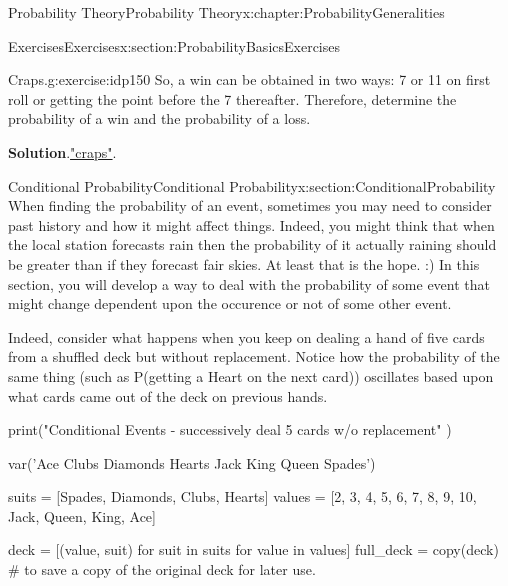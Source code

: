 \documentclass[oneside,10pt,]{book}
\newcommand{\blocktitlefont}{\relax}
\numberwithin{equation}{section}
\begin{document}
\begin{chapterptx}{Probability Theory}{}{Probability Theory}{}{}{x:chapter:ProbabilityGeneralities}
\begin{sectionptx}{Exercises}{}{Exercises}{}{}{x:section:ProbabilityBasicsExercises}
\begin{inlineexercise}{Craps.}{g:exercise:idp150}
So, a win can be obtained in two ways: 7 or 11 on first roll or getting the point before the 7 thereafter. Therefore, determine the probability of a win and the probability of a loss.%
\par\smallskip%
\noindent\textbf{\blocktitlefont Solution}.\hypertarget{g:solution:idp151}{}\quad{}\href{http://mathworld.wolfram.com/Craps.html}{"craps"}.%
\end{inlineexercise}%
\end{sectionptx}
%
%
\typeout{************************************************}
\typeout{************************************************}
%
\begin{sectionptx}{Conditional Probability}{}{Conditional Probability}{}{}{x:section:ConditionalProbability}
When finding the probability of an event, sometimes you may need to consider past history and how it might affect things. Indeed, you might think that when the local station forecasts rain then the probability of it actually raining should be greater than if they forecast fair skies. At least that is the hope. :)  In this section, you will develop a way to deal with the probability of some event that might change dependent upon the occurence or not of some other event.%
\par
Indeed, consider what happens when you keep on dealing a hand of five cards from a shuffled deck but without replacement.  Notice how the probability of the same thing (such as P(getting a Heart on the next card)) oscillates based upon what cards came out of the deck on previous hands.%
\begin{sageinput}
print("Conditional Events - successively deal 5 cards w/o replacement" )

var('Ace Clubs Diamonds Hearts Jack King Queen Spades') 

suits = [Spades, Diamonds, Clubs, Hearts] 
values = [2, 3, 4, 5, 6, 7, 8, 9, 10, Jack, Queen, King, Ace] 

deck = [(value, suit) for suit in suits for value in values]
full_deck = copy(deck)  # to save a copy of the original deck for later use.


\end{sageinput}
\end{sectionptx}
\end{chapterptx}
\end{document}
